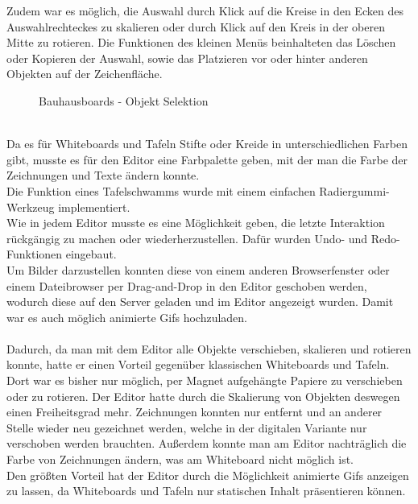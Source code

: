 Zudem war es möglich, die Auswahl durch Klick auf die Kreise in den Ecken des Auswahlrechteckes zu skalieren oder durch Klick auf den Kreis in der oberen Mitte zu rotieren.
Die Funktionen des kleinen Menüs beinhalteten das Löschen oder Kopieren der Auswahl, sowie das Platzieren vor oder hinter anderen Objekten auf der Zeichenfläche.
\begin{figure}
  \centering
  \caption{Bauhausboards - Objekt Selektion}
  \label{img:editorObjectSelection}
\end{figure}
\\
Da es für Whiteboards und Tafeln Stifte oder Kreide in unterschiedlichen Farben gibt, musste es für den Editor eine Farbpalette geben, mit der man die Farbe der Zeichnungen und Texte ändern konnte.
\\
Die Funktion eines Tafelschwamms wurde mit einem einfachen Radiergummi-Werkzeug implementiert.
\\
Wie in jedem Editor musste es eine Möglichkeit geben, die letzte Interaktion rückgängig zu machen oder wiederherzustellen. Dafür wurden Undo- und Redo-Funktionen eingebaut.
\\
Um Bilder darzustellen konnten diese von einem anderen Browserfenster oder einem Dateibrowser per Drag-and-Drop in den Editor geschoben werden, wodurch diese auf den Server geladen und im Editor angezeigt wurden.
Damit war es auch möglich animierte Gifs hochzuladen.
\\
\\
Dadurch, da man mit dem Editor alle Objekte verschieben, skalieren und rotieren konnte, hatte er einen Vorteil gegenüber klassischen Whiteboards und Tafeln.
Dort war es bisher nur möglich, per Magnet aufgehängte Papiere zu verschieben oder zu rotieren.
Der Editor hatte durch die Skalierung von Objekten deswegen einen Freiheitsgrad mehr.
Zeichnungen konnten nur entfernt und an anderer Stelle wieder neu gezeichnet werden, welche in der digitalen Variante nur verschoben werden brauchten. Außerdem konnte man am Editor nachträglich die Farbe von Zeichnungen ändern, was am Whiteboard nicht möglich ist.
\\
Den größten Vorteil hat der Editor durch die Möglichkeit animierte Gifs anzeigen zu lassen, da Whiteboards und Tafeln nur statischen Inhalt präsentieren können.
\\
\\


